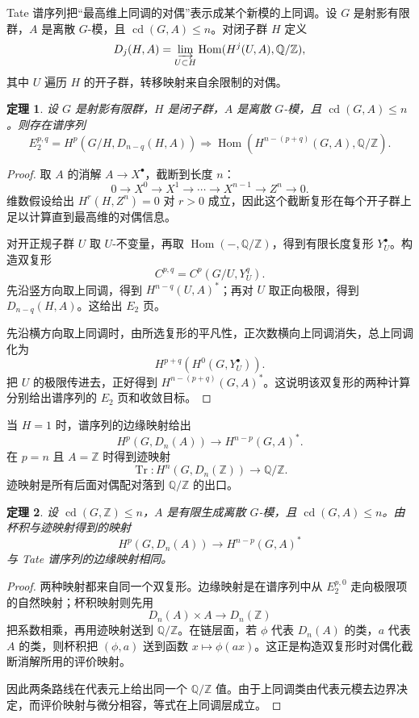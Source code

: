 \documentclass[11pt,a4paper,openany]{ctexbook}
\numberwithin{equation}{chapter}
\newcommand{\Q}{\mathbb{Q}}
\newcommand{\Z}{\mathbb{Z}}
\newcommand{\Hom}{\operatorname{Hom}}
\theoremstyle{plain}
\newtheorem{theorem}{定理}[chapter]
\theoremstyle{definition}
\theoremstyle{remark}
\begin{document}
Tate 谱序列把“最高维上同调的对偶”表示成某个新模的上同调。设 $G$ 是射影有限群，$A$ 是离散 $G$-模，且 $\operatorname{cd}(G,A)\leq n$。对闭子群 $H$ 定义
\[
D_j(H,A)=\varinjlim_{U\subset H}\Hom(H^j(U,A),\Q/\Z),
\]
其中 $U$ 遍历 $H$ 的开子群，转移映射来自余限制的对偶。

\begin{theorem}
设 $G$ 是射影有限群，$H$ 是闭子群，$A$ 是离散 $G$-模，且 $\operatorname{cd}(G,A)\leq n$。则存在谱序列
\[
E_2^{p,q}=H^p(G/H,D_{n-q}(H,A))
\Rightarrow \Hom(H^{n-(p+q)}(G,A),\Q/\Z).
\]
\end{theorem}

\begin{proof}
取 $A$ 的消解 $A\to X^\bullet$，截断到长度 $n$：
\[
0\to X^0\to X^1\to\cdots\to X^{n-1}\to Z^n\to 0.
\]
维数假设给出 $H^r(H,Z^n)=0$ 对 $r>0$ 成立，因此这个截断复形在每个开子群上足以计算直到最高维的对偶信息。

对开正规子群 $U$ 取 $U$-不变量，再取 $\Hom(-,\Q/\Z)$，得到有限长度复形 $Y^\bullet_U$。构造双复形
\[
C^{p,q}=C^p(G/U,Y^q_U).
\]
先沿竖方向取上同调，得到 $H^{n-q}(U,A)^*$；再对 $U$ 取正向极限，得到 $D_{n-q}(H,A)$。这给出 $E_2$ 页。

先沿横方向取上同调时，由所选复形的平凡性，正次数横向上同调消失，总上同调化为
\[
H^{p+q}(H^0(G,Y^\bullet_U)).
\]
把 $U$ 的极限传进去，正好得到 $H^{n-(p+q)}(G,A)^*$。这说明该双复形的两种计算分别给出谱序列的 $E_2$ 页和收敛目标。
\end{proof}

当 $H=1$ 时，谱序列的边缘映射给出
\[
H^p(G,D_n(A))\longrightarrow H^{n-p}(G,A)^*.
\]
在 $p=n$ 且 $A=\Z$ 时得到迹映射
\[
\operatorname{Tr}:H^n(G,D_n(\Z))\longrightarrow \Q/\Z.
\]
迹映射是所有后面对偶配对落到 $\Q/\Z$ 的出口。

\begin{theorem}
设 $\operatorname{cd}(G,\Z)\leq n$，$A$ 是有限生成离散 $G$-模，且 $\operatorname{cd}(G,A)\leq n$。由杯积与迹映射得到的映射
\[
H^p(G,D_n(A))\longrightarrow H^{n-p}(G,A)^*
\]
与 Tate 谱序列的边缘映射相同。
\end{theorem}

\begin{proof}
两种映射都来自同一个双复形。边缘映射是在谱序列中从 $E_2^{p,0}$ 走向极限项的自然映射；杯积映射则先用
\[
D_n(A)\times A\longrightarrow D_n(\Z)
\]
把系数相乘，再用迹映射送到 $\Q/\Z$。在链层面，若 $\phi$ 代表 $D_n(A)$ 的类，$a$ 代表 $A$ 的类，则杯积把 $(\phi,a)$ 送到函数 $x\mapsto \phi(ax)$。这正是构造双复形时对偶化截断消解所用的评价映射。

因此两条路线在代表元上给出同一个 $\Q/\Z$ 值。由于上同调类由代表元模去边界决定，而评价映射与微分相容，等式在上同调层成立。
\end{proof}
\end{document}
